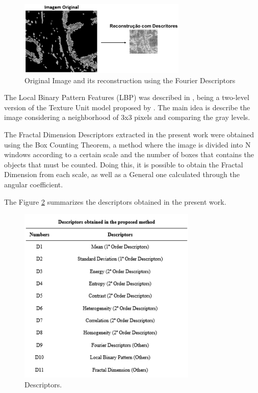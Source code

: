 \documentclass[conference]{IEEEtran}
\begin{document}
		\begin{figure}[h]
		    \centering
		    \includegraphics[width=8cm]{images/imagem_reconstrucao.png}
		    \caption{Original Image and its reconstruction using the Fourier Descriptors}
		    \label{fig:imagem_reconstrucao}
		\end{figure}
		The Local Binary Pattern Features (LBP) was described in \cite{lbp-OjalaPH96}, being a two-level version of the Texture Unit model proposed by \cite{Wang:1990:TCU:83597.83606}. The main idea is describe the image considering a neighborhood of 3x3 pixels and comparing the gray levels.\par
		The Fractal Dimension Descriptors extracted in the present work were obtained using the Box Counting Theorem, a method where the image is divided into N windows according to a certain scale and the number of boxes that contains the objects that must be counted. Doing this, it is possible to obtain the Fractal Dimension from each scale, as well as a General one calculated through the angular coefficient.\par
		The Figure \ref{fig:table_descriptors} summarizes the descriptors obtained in the present work. 
		\begin{figure}[h]
		    \centering
		    \includegraphics[width=8.5cm]{images/table_descriptors.png}
		    \caption{Descriptors.}
		    \label{fig:table_descriptors}
		\end{figure}
\end{document}
